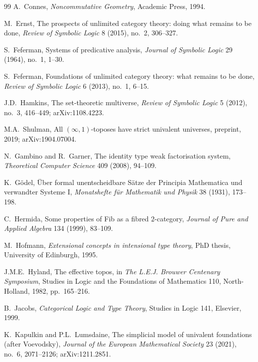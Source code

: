 \documentclass[11pt]{article}
\theoremstyle{plain}
\theoremstyle{definition}
\begin{document}
\begin{thebibliography}{99}
A.~Connes,
\newblock \emph{Noncommutative Geometry},
\newblock Academic Press, 1994.

M.~Ernst,
\newblock The prospects of unlimited category theory: doing what remains to be done,
\newblock \emph{Review of Symbolic Logic} 8 (2015), no.~2, 306--327.

S.~Feferman,
\newblock Systems of predicative analysis,
\newblock \emph{Journal of Symbolic Logic} 29 (1964), no.~1, 1--30.

S.~Feferman,
\newblock Foundations of unlimited category theory: what remains to be done,
\newblock \emph{Review of Symbolic Logic} 6 (2013), no.~1, 6--15.

J.D.~Hamkins,
\newblock The set-theoretic multiverse,
\newblock \emph{Review of Symbolic Logic} 5 (2012), no.~3, 416--449; arXiv:1108.4223.

M.A.~Shulman,
\newblock All $(\infty, 1)$-toposes have strict univalent universes,
\newblock preprint, 2019; arXiv:1904.07004.

N.~Gambino and R.~Garner,
\newblock The identity type weak factorisation system,
\newblock \emph{Theoretical Computer Science} 409 (2008), 94--109.

K.~G\"odel,
\newblock \"Uber formal unentscheidbare S\"atze der Principia Mathematica und verwandter Systeme I,
\newblock \emph{Monatshefte f\"ur Mathematik und Physik} 38 (1931), 173--198.

C.~Hermida,
\newblock Some properties of Fib as a fibred $2$-category,
\newblock \emph{Journal of Pure and Applied Algebra} 134 (1999), 83--109.

M.~Hofmann,
\newblock \emph{Extensional concepts in intensional type theory},
\newblock PhD thesis, University of Edinburgh, 1995.

J.M.E.~Hyland,
\newblock The effective topos,
\newblock in \emph{The L.E.J. Brouwer Centenary Symposium}, Studies in Logic and the Foundations of Mathematics 110, North-Holland, 1982, pp.~165--216.

B.~Jacobs,
\newblock \emph{Categorical Logic and Type Theory},
\newblock Studies in Logic 141, Elsevier, 1999.

K.~Kapulkin and P.L.~Lumsdaine,
\newblock The simplicial model of univalent foundations (after Voevodsky),
\newblock \emph{Journal of the European Mathematical Society} 23 (2021), no.~6, 2071--2126; arXiv:1211.2851.


\end{thebibliography}
\end{document}
